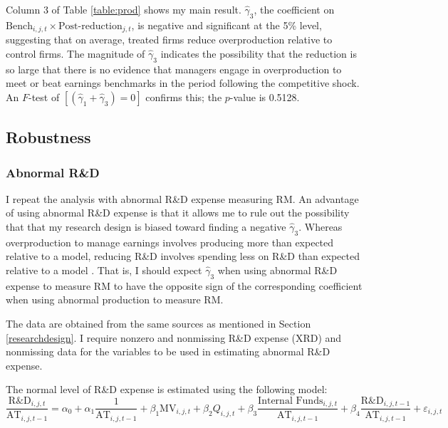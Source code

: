 \documentclass[notitlepage, 12pt]{article}
\begin{document}
\noindent Column 3 of Table \ref{table:prod} shows my main result. $\widehat{\gamma}_{3}$, the coefficient on $\text{Bench}_{i,j,t}\times\text{Post-reduction}_{j,t}$, is negative and significant at the 5\% level, suggesting that on average, treated firms reduce overproduction relative to control firms. The magnitude of $\widehat{\gamma}_{3}$ indicates the possibility that the reduction is so large that there is no evidence that managers engage in overproduction to meet or beat earnings benchmarks in the period following the competitive shock. An $F$-test of $[(\widehat{\gamma}_{1} + \widehat{\gamma}_{3}) = 0]$ confirms this; the $p$-value is 0.5128.

\subsection{Robustness}
\subsubsection{Abnormal R\&D}
I repeat the analysis with abnormal R\&D expense measuring RM. An advantage of using abnormal R\&D expense is that it allows me to rule out the possibility that that my research design is biased toward finding a negative $\widehat{\gamma}_{3}$. Whereas overproduction to manage earnings involves producing more than expected relative to a model, reducing R\&D involves spending less on R\&D than expected relative to a model \citep{roychowdhury:2006}. That is, I should expect $\widehat{\gamma}_{3}$ when using abnormal R\&D expense to measure RM to have the opposite sign of the corresponding coefficient when using abnormal production to measure RM.
\newline

\noindent The data are obtained from the same sources as mentioned in Section \ref{researchdesign}. I require nonzero and nonmissing R\&D expense (XRD) and nonmissing data for the variables to be used in estimating abnormal R\&D expense.
\newline

\noindent The normal level of R\&D expense is estimated using the following model:
\begin{equation}\label{eq:normrd}
\dfrac{\text{R\&D}_{i,j,t}}{\text{AT}_{i,j,t-1}} = \alpha_{0} + \alpha_{1}\dfrac{1}{\text{AT}_{i,j,t-1}} + \beta_{1}\text{MV}_{i,j,t} + \beta_{2}Q_{i,j,t} + \beta_{3}\dfrac{\text{Internal Funds}_{i,j,t}}{\text{AT}_{i,j,t-1}} + \beta_{4}\dfrac{\text{R\&D}_{i,j,t-1}}{\text{AT}_{i,j,t-1}} + \varepsilon_{i,j,t}
\end{equation}
\end{document}

